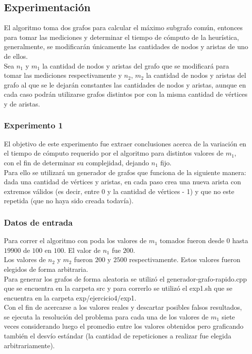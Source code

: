 \subsection{Experimentación}
\noindent El algoritmo toma dos grafos para calcular el máximo subgrafo común, entonces para tomar las mediciones y determinar el tiempo de cómputo de la heurística, generalmente, se modificarán únicamente las cantidades de nodos y aristas de uno de ellos. \\
Sea $n_1$ y $m_1$ la cantidad de nodos y aristas del grafo que se modificará para tomar las mediciones respectivamente y $n_2$, $m_2$ la cantidad de nodos y aristas del grafo al que se le dejarán constantes las cantidades de nodos y aristas, aunque en cada caso podrán utilizarse grafos distintos por con la misma cantidad de vértices y de aristas.
    
	\subsubsection*{Experimento 1}\; 
\noindent  El objetivo de este experimento fue extraer conclusiones acerca de la variación en el tiempo de cómputo requerido por el algoritmo para distintos valores de $m_1$, con el fin de determinar su complejidad, dejando $n_1$ fijo. \\
   Para ello se utilizará un generador de grafos que funciona de la siguiente manera: dada una cantidad de vértices y aristas, en cada paso crea una nueva arista con extremos válidos (es decir, entre 0 y la cantidad de vértices - 1) y que no este repetida (que no haya sido creada todavía). 
   
     	\subsubsection*{Datos de entrada}\;
        \noindent Para correr el algoritmo con poda los valores de $m_1$ tomados fueron desde $0$ hasta $19900$ de $100$ en $100$. El valor de $n_1$ fue $200$.\\
       Los valores de $n_2$ y $m_2$ fueron $200$ y $2500$ respectivamente. Estos valores fueron elegidos de forma arbitraria.\\
        Para generar los grafos de forma aleatoria se utilizó el generador-grafo-rapido.cpp que se encuentra en la carpeta src y para correrlo se utilizó el exp1.sh que se encuentra en la carpeta exp/ejercicio4/exp1. \\
        Con el fin de acercarse a los valores reales y descartar posibles falsos resultados, se ejecuta la resolución del problema para cada una de los valores de $m_1$ siete veces considerando luego el promedio entre los valores obtenidos pero graficando también el desvío estándar (la cantidad de repeticiones a realizar fue elegida arbitrariamente).\; 
